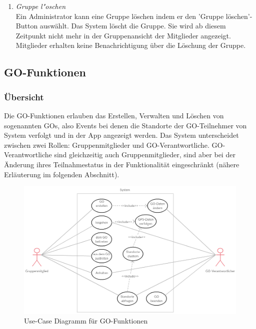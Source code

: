 \documentclass[parskip=full]{scrartcl}
\def\threedigits#1{%
  \ifnum#1<100 0\fi
  \ifnum#1<10 0\fi
  \number#1}
\begin{document}
\begin{enumerate}[label={\textbf{/F\protect\threedigits{\theenumi}0/}}, leftmargin=*, resume]
\newpage

	\item \textit{Gruppe l"oschen}\label{Gruppe löschen} \\
	Ein Administrator kann eine Gruppe löschen indem er den 'Gruppe löschen'-Button auswählt. Das System löscht die Gruppe. Sie wird ab diesem Zeitpunkt nicht mehr in der Gruppenansicht der Mitglieder angezeigt. Mitglieder erhalten keine Benachrichtigung über die Löschung der Gruppe.
	
\end{enumerate}
	
\subsection{GO-Funktionen}

\subsubsection{Übersicht}
Die GO-Funktionen erlauben das Erstellen, Verwalten und Löschen von sogenannten GOs, also Events bei denen die Standorte der \gls{GO-Teilnehmer} von System verfolgt und in der App angezeigt werden. Das System unterscheidet zwischen zwei Rollen: Gruppenmitglieder und GO-Verantwortliche. GO-Verantwortliche sind gleichzeitig auch Gruppenmitglieder, sind aber bei der Änderung ihres Teilnahmestatus in der Funktionalität eingeschränkt (nähere Erläuterung im folgenden Abschnitt).

	\begin{figure}[H]
		\centering
		\includegraphics[width=1\textwidth]{Use_Cases/use_case_GO.png}
		\caption{Use-Case Diagramm für GO-Funktionen}
	\end{figure}

 
\end{document}
